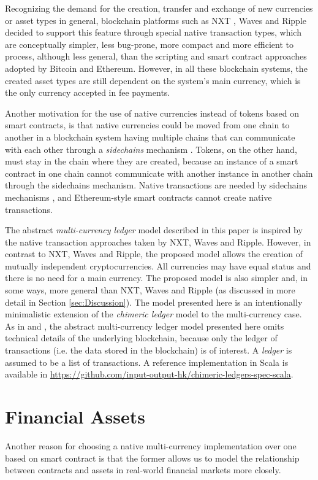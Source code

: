 \documentclass{llncs}
\begin{document}
Recognizing the demand for the creation, transfer and exchange of new currencies or asset types in general, blockchain platforms such as NXT \cite{NXT}, Waves \cite{Waves} and Ripple \cite{Ripple} decided to support this feature through special native transaction types, which are conceptually simpler, less bug-prone, more compact and more efficient to process, although less general, than the scripting and smart contract approaches adopted by Bitcoin and Ethereum. However, in all these blockchain systems, the created asset types are still dependent on the system's main currency, which is the only currency accepted in fee payments.

Another motivation for the use of native currencies instead of tokens based on smart contracts, is that native currencies could be moved from one chain to another in a blockchain system having multiple chains that can communicate with each other through a \emph{sidechains} mechanism \cite{Sidechains,SidechainsOuroboros}. Tokens, on the other hand, must stay in the chain where they are created, because an instance of a smart contract in one chain cannot communicate with another instance in another chain through the sidechains mechanism. Native transactions are needed by sidechains mechanisms \cite{SidechainsOuroboros}, and Ethereum-style smart contracts cannot create native transactions.

The abstract \emph{multi-currency ledger} model described in this paper is inspired by the native transaction approaches taken by NXT, Waves and Ripple. However, in contrast to NXT, Waves and Ripple, the proposed model allows the creation of mutually independent cryptocurrencies. All currencies may have equal status and there is no need for a main currency. The proposed model is also simpler and, in some ways, more general than NXT, Waves and Ripple (as discussed in more detail in Section \ref{sec:Discussion}). The model presented here is an intentionally minimalistic extension of the \emph{chimeric ledger} model \cite{ChimericLedgers} to the multi-currency case. As in \cite{ChimericLedgers} and \cite{UTxOScripts}, the abstract multi-currency ledger model presented here omits technical details of the underlying blockchain, because only the ledger of transactions (i.e. the data stored in the blockchain) is of interest. A \emph{ledger} is assumed to be a list of transactions.
%
A reference implementation in Scala is available in \url{https://github.com/input-output-hk/chimeric-ledgers-spec-scala}.

\section{Financial Assets}
Another reason for choosing a native multi-currency implementation over one  based on smart contract is that the former allows us to model the relationship between contracts and assets in real-world financial markets more closely.
\end{document}

